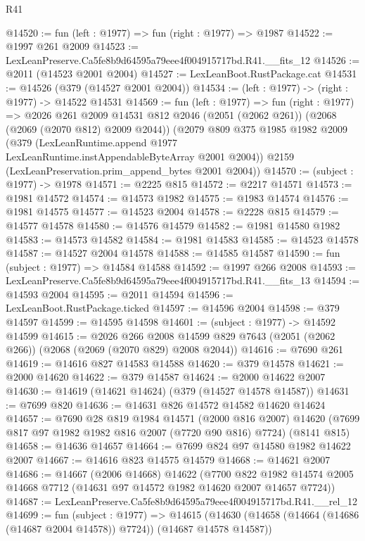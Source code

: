 \begin{lexlean}{R41}
\begin{coremodule}
@14520 := fun (left : @1977) => fun (right : @1977) => @1987
@14522 := @1997 @261 @2009
@14523 := LexLeanPreserve.Ca5fe8b9d64595a79eee4f004915717bd.R41.__fits_12
@14526 := @2011 (@14523 @2001 @2004)
@14527 := LexLeanBoot.RustPackage.cat
@14531 := @14526 (@379 (@14527 @2001 @2004))
@14534 := (left : @1977) -> (right : @1977) -> @14522 @14531
@14569 := fun (left : @1977) =>
  fun (right : @1977) =>
  @2026
    @261
    @2009
    @14531
    @812
    @2046
    (@2051 (@2062 @261))
    (@2068 (@2069 (@2070 @812) @2009 @2044))
    (@2079
      @809
      @375
      @1985
      @1982
      @2009
      (@379 (LexLeanRuntime.append @1977 LexLeanRuntime.instAppendableByteArray @2001 @2004))
      @2159
      (LexLeanPreservation.prim_append_bytes @2001 @2004))
@14570 := (subject : @1977) -> @1978
@14571 := @2225 @815
@14572 := @2217 @14571
@14573 := @1981 @14572
@14574 := @14573 @1982
@14575 := @1983 @14574
@14576 := @1981 @14575
@14577 := @14523 @2004
@14578 := @2228 @815
@14579 := @14577 @14578
@14580 := @14576 @14579
@14582 := @1981 @14580 @1982
@14583 := @14573 @14582
@14584 := @1981 @14583
@14585 := @14523 @14578
@14587 := @14527 @2004 @14578
@14588 := @14585 @14587
@14590 := fun (subject : @1977) => @14584 @14588
@14592 := @1997 @266 @2008
@14593 := LexLeanPreserve.Ca5fe8b9d64595a79eee4f004915717bd.R41.__fits_13
@14594 := @14593 @2004
@14595 := @2011 @14594
@14596 := LexLeanBoot.RustPackage.ticked
@14597 := @14596 @2004
@14598 := @379 @14597
@14599 := @14595 @14598
@14601 := (subject : @1977) -> @14592 @14599
@14615 := @2026
    @266
    @2008
    @14599
    @829
    @7643
    (@2051 (@2062 @266))
    (@2068 (@2069 (@2070 @829) @2008 @2044))
@14616 := @7690 @261
@14619 := @14616 @827 @14583 @14588
@14620 := @379 @14578
@14621 := @2000 @14620
@14622 := @379 @14587
@14624 := @2000 @14622 @2007
@14630 := @14619 (@14621 @14624) (@379 (@14527 @14578 @14587))
@14631 := @7699 @820
@14636 := @14631 @826 @14572 @14582 @14620 @14624
@14657 := @7690
    @28
    @819
    @1984
    @14571
    (@2000 @816 @2007)
    @14620
    (@7699 @817 @97 @1982 @1982 @816 @2007 (@7720 @90 @816) @7724)
    (@8141 @815)
@14658 := @14636 @14657
@14664 := @7699 @824 @97 @14580 @1982 @14622 @2007
@14667 := @14616 @823 @14575 @14579
@14668 := @14621 @2007
@14686 := @14667
    (@2006 @14668)
    @14622
    (@7700 @822 @1982 @14574 @2005 @14668 @7712 (@14631 @97 @14572 @1982 @14620 @2007 @14657 @7724))
@14687 := LexLeanPreserve.Ca5fe8b9d64595a79eee4f004915717bd.R41.__rel_12
@14699 := fun (subject : @1977) =>
  @14615 (@14630 (@14658 (@14664 (@14686 (@14687 @2004 @14578)) @7724)) (@14687 @14578 @14587))

\end{coremodule}
\end{lexlean}
